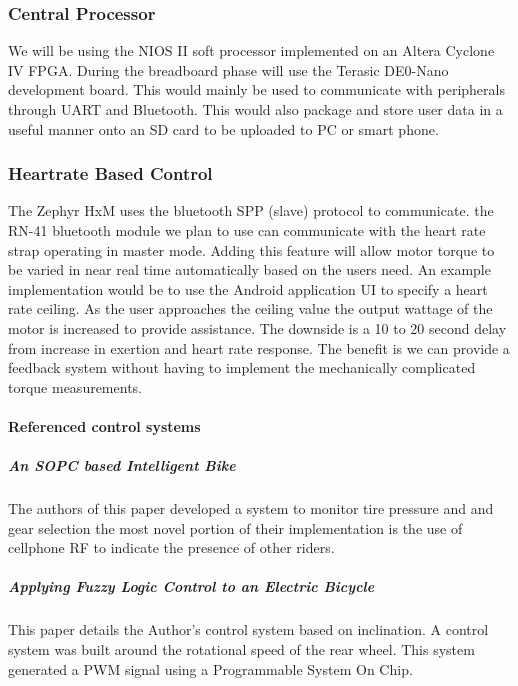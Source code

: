 \documentclass[12pt,article]{IEEEtran}
\begin{document}
	\subsubsection{Central Processor}
		We will be using the NIOS II soft processor implemented on an Altera Cyclone IV FPGA. During
		the breadboard phase will use the Terasic DE0-Nano development board. This would mainly be 
		used to communicate with peripherals through UART and Bluetooth. This would also package and 
		store user data in a useful manner onto an SD card to be uploaded to PC or smart phone.	
	
	\subsubsection{Heartrate Based Control}
		The Zephyr HxM uses the bluetooth SPP (slave) protocol to communicate. the RN-41 bluetooth module 
		we plan to use can communicate with the heart rate strap operating  in master mode. Adding this feature 
		will allow motor torque to be varied in near real time automatically based on the users need. An example 
		implementation would be to use the Android application UI to specify a heart rate ceiling. As the user approaches 
		the ceiling value the output wattage of the motor is increased to provide assistance. The downside 
		is a 10 to 20 second delay from increase in exertion and heart rate response. The benefit is we can 
		provide a feedback system without having to implement the mechanically complicated torque measurements. \cite{HxMAPI}

	\paragraph{Referenced control systems}
		\subparagraph{An SOPC based Intelligent Bike}	
			The authors of this paper developed a system to monitor tire pressure and and gear selection
			the most novel portion of their implementation is the use of cellphone RF to indicate the
			presence of other riders. \cite{SOPCBike}
			
		\subparagraph{Applying Fuzzy Logic Control to an Electric Bicycle}
			This paper details the Author's control system based on inclination. A control system
			was built around the rotational speed of the rear wheel. This system generated a PWM
			signal using a Programmable System On Chip.\cite{FuzzyLogicControl}
            
\end{document}
